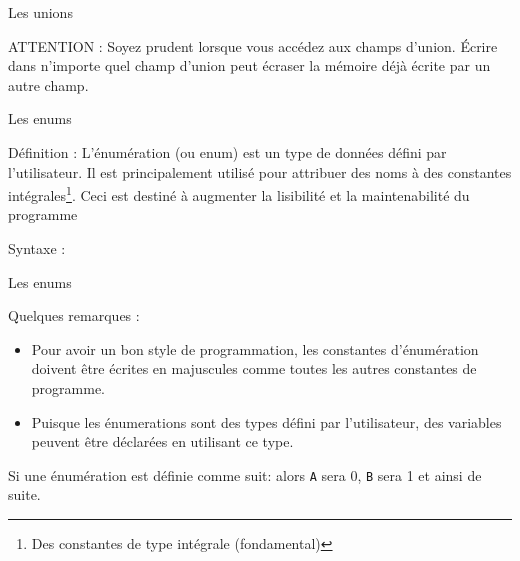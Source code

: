 \documentclass{beamer}
\begin{document}
\begin{darkframes}
	\begin{frame}{Les unions}
		\begin{alertblock}{ATTENTION : Soyez prudent lorsque vous accédez aux champs d'union. Écrire dans n'importe quel champ d'union peut écraser la mémoire déjà écrite par un autre champ.}
		\unionExmpDanger
		\end{alertblock}
	\end{frame}
	
	    

	\begin{frame}{Les enums}  	
		\begin{block}{Définition :}
			L'énumération (ou enum) est un type de données défini par l'utilisateur. Il est principalement utilisé pour attribuer des noms à des \alert{constantes intégrales}\footnote[frame]{Des constantes de type intégrale (fondamental)}. Ceci est destiné à augmenter la lisibilité et la maintenabilité du programme
		\end{block}
		\begin{block}{Syntaxe :}
			\enumSyntax
		\end{block}
	\end{frame}
	

	\begin{frame}{Les enums}
		\begin{alertblock}{Quelques remarques :}
			\begin{itemize}
				\item Pour avoir  un bon style de programmation, les constantes d'énumération doivent être écrites en majuscules comme toutes les autres constantes de programme.
				\item Puisque les énumerations sont des types défini par l'utilisateur, des variables peuvent être déclarées en utilisant ce type.
			\end{itemize}
			Si une énumération est définie comme suit: \enumOne alors \texttt{A} sera 0, \texttt{B} sera 1 et ainsi de suite.
		\end{alertblock}
	\end{frame}
	

\end{darkframes}
\end{document}
